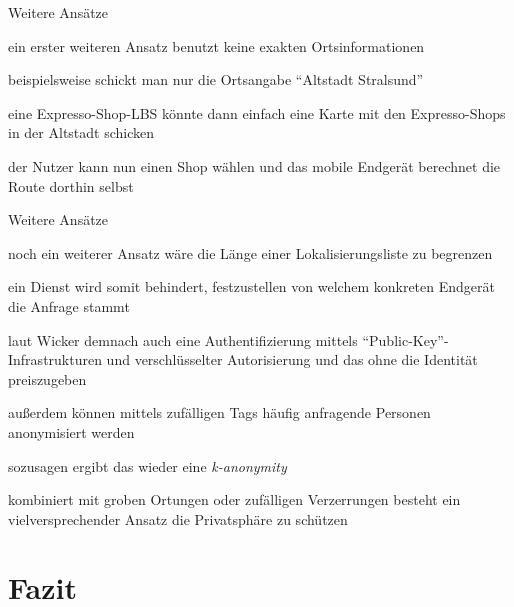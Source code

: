 \begin{frame}{Weitere Ansätze}
\itemize
\item ein erster weiteren Ansatz benutzt keine exakten Ortsinformationen
\item beispielsweise schickt man nur die Ortsangabe "`Altstadt Stralsund"'
\item eine Expresso-Shop-LBS könnte dann einfach eine Karte mit den Expresso-Shops in der Altstadt schicken
\item der Nutzer kann nun einen Shop wählen und das mobile Endgerät berechnet die Route dorthin selbst
\enditemize
\end{frame}

\begin{frame}{Weitere Ansätze}
\itemize
\item noch ein weiterer Ansatz wäre die Länge einer Lokalisierungsliste zu begrenzen
\item ein Dienst wird somit behindert, festzustellen von welchem konkreten Endgerät die Anfrage stammt
\item laut Wicker demnach auch eine Authentifizierung mittels "`Public-Key"'-Infrastrukturen und verschlüsselter Autorisierung und das ohne die Identität preiszugeben
\item außerdem können mittels zufälligen Tags häufig anfragende Personen anonymisiert werden
\item sozusagen ergibt das wieder eine \textit{k-anonymity}
\item kombiniert mit groben Ortungen oder zufälligen Verzerrungen besteht ein vielversprechender Ansatz die Privatsphäre zu schützen
\enditemize
\end{frame}

\section{Fazit}
